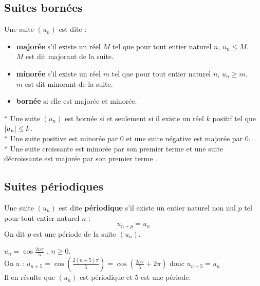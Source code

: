 \subsection*{Suites bornées}
\begin{definition}
Une suite $(u_{n})$ est dite : 
\begin{itemize}
\item[\textbullet]  \textbf{\color{magenta} majorée} s'il existe un réel $ M $ tel que pour tout entier naturel $ n $, $ u_{n}\leq M $.\\ $ M $ est dit majorant de la suite.
\item[\textbullet] \textbf{\color{magenta} minorée} s'il existe un réel $ m $ tel que pour tout entier naturel $ n $, $ u_{n}\geq m $.\\ $ m $ est dit minorant de la suite.
\item[\textbullet] \textbf{\color{magenta} bornée} si elle est majorée et minorée.
\end{itemize}
\end{definition}
\begin{remark}
$ \ast $ Une suite $(u_{n})$ est bornée si et seulement si il existe un réel $ k $ positif tel que $ \left\lvert u_{n} \right\rvert \leq k$.\\
$ \ast $ Une suite positive est minorée par $ 0 $ et une suite négative est majorée par $ 0 $.\\
$ \ast $ Une suite croissante est minorée par son premier terme et une suite décroissante est majorée par son  premier terme .
\end{remark}
\subsection*{Suites périodiques}
\begin{definition}
Une suite $(u_{n})$ est dite  \textbf{périodique} s'il existe un entier naturel non nul $ p $ tel pour tout entier naturel $ n $ :\[u_{n+p}=u_{n}\]
On dit $ p $ est une période de la suite $(u_{n})$.
\end{definition} 
\begin{example}
$ u_{n}= \cos\frac{2n\pi}{5} $ , $ n\geq 0 $.\\
On a : $ u_{n+5}=\cos(\frac{2(n+5)\pi}{5})=\cos(\frac{2n\pi}{5}+2\pi) $ donc
$ u_{n+5}=u_{n}$ \\
Il en résulte que $(u_{n})$ est périodique et 5 est une période.
\end{example}
